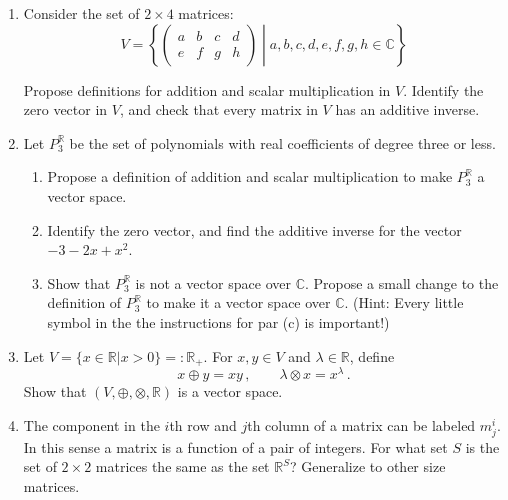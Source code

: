 \begin{enumerate}

\vspace{5mm}

\item Consider the set of $2\times 4$ matrices:
\[ V = \left\{ 
\begin{pmatrix}
a & b & c & d \\
e & f & g & h 
\end{pmatrix}
\middle| a,b,c,d,e,f,g,h \in \mathbb{C} \right\}
\]

Propose definitions for addition and scalar multiplication in $V$.  Identify the zero vector in $V$, and check that every matrix in $V$ has an additive inverse.  

\vspace{5mm}

\item \label{problem_polynomials} Let $P_3^{\mathbb{R}}$ be the set of polynomials with real coefficients of degree three or less.
	\begin{enumerate}
	\item Propose a definition of addition and scalar multiplication to make $P_3^{\mathbb{R}}$ a vector space.

	\item Identify the zero vector, and find the additive inverse for the vector $-3-2x+x^2$.

	\item Show that $P_3^{\mathbb{R}}$ is not a vector space over $\mathbb{C}$.  Propose a small change to the definition of $P_3^{\mathbb{R}}$ to make it a vector space over $\mathbb{C}$. (Hint: Every little symbol in the the instructions for par (c) is important!)
\end{enumerate}


\item Let $V=\{x\in {\mathbb R}|x>0\}=:{\mathbb R}_+$. For $x,y\in V$ and $\lambda\in {\mathbb R}$, define
\[
x\oplus y = xy\, ,\qquad \lambda \otimes x = x^\lambda\, .
\]
Show that $(V,\oplus,\otimes,{\mathbb R})$ is a vector space.

\item The component in the $i$th row and $j$th column of a matrix can be labeled $m^i_{j}$. In this sense a matrix is a function of a pair of integers. For what set $S$ is the set of  $2\times2$ matrices the same as the set $\mathbb{R}^S$? Generalize to other size matrices. 


\end{enumerate}
